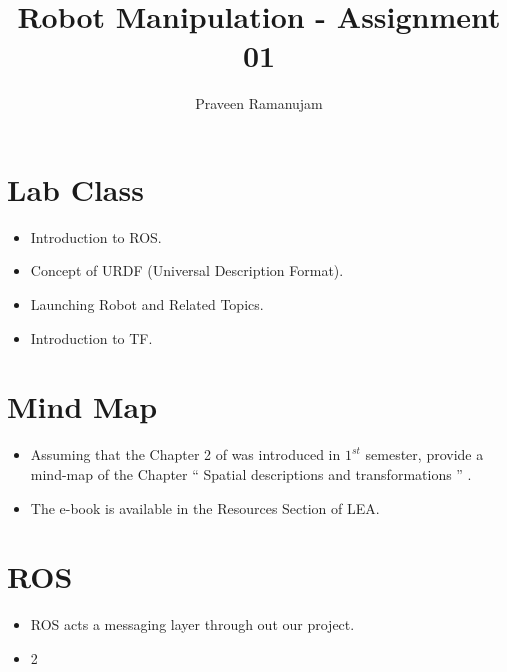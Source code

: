 \documentclass[a4paper,10pt]{article}
\date{\displaydate{date}}
\title{Robot Manipulation - Assignment 01}
\author{Praveen Ramanujam}
\begin{document}
\maketitle


\section{Lab Class}
\begin{itemize}
 \item Introduction to ROS.
 \item Concept of URDF (Universal Description Format).
 \item Launching Robot and Related Topics.
 \item Introduction to TF.
\end{itemize}



\section{Mind Map}
\begin{itemize}
 \item  Assuming that the Chapter 2 of \cite{Craig} was introduced in $1^{st}$ semester, provide a mind-map of the Chapter `` Spatial descriptions and transformations
 '' .
 \item The e-book is available in the Resources Section of LEA.
\end{itemize}




\section{ROS}
\begin{itemize}
 \item ROS acts a messaging layer through out our project.
 \item 2
\end{itemize}



\end{document}
